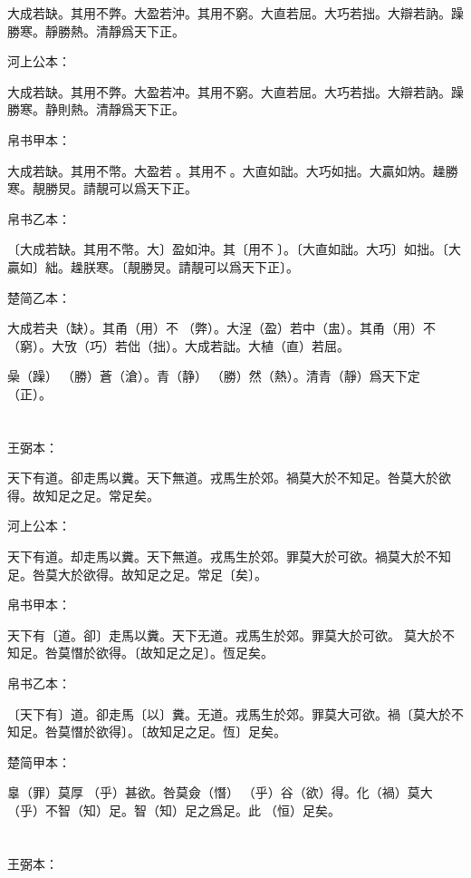 \documentclass[a5paper]{ctexbook}
\begin{document}
    大成若缺。其用不弊。大盈若沖。其用不窮。大直若屈。大巧若拙。大辯若訥。躁勝寒。靜勝熱。清靜爲天下正。

    河上公本：

    大成若缺。其用不弊。大盈若冲。其用不窮。大直若屈。大巧若拙。大辯若訥。躁勝寒。静則熱。清靜爲天下正。

    帛书甲本：

    大成若缺。其用不幣。大盈若𥁵。其用不𡩫。大直如詘。大巧如拙。大贏如㶧。趮勝寒。靚勝炅。請靚可以爲天下正。

    帛书乙本：

    〔大成若缺。其用不幣。大〕盈如沖。其〔用不𡩫〕。〔大直如詘。大巧〕如拙。〔大贏如〕絀。趮朕寒。〔靚勝炅。請靚可以爲天下正〕。

    楚简乙本：

    大成若夬（缺）。其甬（用）不󶵢（弊）。大浧（盈）若中（盅）。其甬（用）不󶵣（窮）。大攷（巧）若㑁（拙）。大成若詘。大植（直）若屈。

    喿（躁）󼡲（勝）蒼（滄）。青（静）󼡲（勝）然（熱）。清青（靜）爲天下定（正）。

    \chapter{}
    王弼本：

    天下有道。卻走馬以糞。天下無道。戎馬生於郊。禍莫大於不知足。咎莫大於欲得。故知足之足。常足矣。

    河上公本：

    天下有道。却走馬以糞。天下無道。戎馬生於郊。罪莫大於可欲。禍莫大於不知足。咎莫大於欲得。故知足之足。常足〔矣〕。

    帛书甲本：

    天下有〔道。卻〕走馬以糞。天下无道。戎馬生於郊。罪莫大於可欲。𢢸莫大於不知足。咎莫憯於欲得。〔故知足之足〕。恆足矣。

    帛书乙本：

    〔天下有〕道。卻走馬〔以〕糞。无道。戎馬生於郊。罪莫大可欲。禍〔莫大於不知足。咎莫憯於欲得〕。〔故知足之足。恆〕足矣。

    楚简甲本：

    辠（罪）莫厚󶴋（乎）甚欲。咎莫僉（憯）󶴋（乎）谷（欲）得。化（禍）莫大󶴋（乎）不智（知）足。智（知）足之爲足。此𠄨（恒）足矣。

    \chapter{}
    王弼本：
\end{document}
